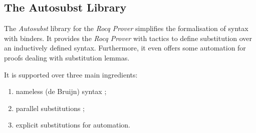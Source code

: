 \begin{comment}
Having an explicit notation for substitution, we can define the $\beta$-reduction step as 
\[ (\lambda . M) N \to_\beta M[N \cdot id]. \]

This is almost what we want. 
In most cases, we want to calculate our term $M[N \cdot id]$ modulo explicit substitutions, recovering the expected result for the substitution. We want to describe reduction rules for substitutions.
	
\begin{definition}[Rewriting rules for substitutions]
	\begin{align*}
		& 0[id] = 0 \qquad
		& id \circ s = s \\
		& 0[M \cdot \sigma] = M \qquad
		& \uparrow \circ \ id = \ \uparrow \\
		& (M N)[\sigma] = (M[\sigma])(N[\sigma]) \qquad
		& \uparrow \circ \ (M \cdot \sigma) = \sigma \\
		& (\lambda . M)[\sigma] = \lambda . (M[0 \cdot (\sigma \ \circ \uparrow)]) \qquad
		& (M \cdot \sigma) \circ \tau = M[\tau] \cdot (\sigma \circ \tau) \\
		& M[\sigma \circ \tau] = M[\sigma][\tau] \qquad
		& (\sigma_1 \circ \sigma_2) \circ \sigma_3 = \sigma_1 \circ (\sigma_2 \circ \sigma_3)
	\end{align*}
\end{definition}

In \cite{Abadi}, it is proved that these rules provide a complete rewriting system to eliminate terms of the form $M[\sigma]$.
\end{comment}

\subsection{The Autosubst Library}
\cite{AutosubstSchafer}

The \textit{Autosubst} library for the \textit{Rocq Prover} simplifies the formalisation of syntax with binders.
It provides the \textit{Rocq Prover} with tactics to define substitution over an inductively defined syntax.
Furthermore, it even offers some automation for proofs dealing with substitution lemmas.

It is supported over three main ingredients:
\begin{enumerate}
\item nameless (de Bruijn) syntax ;
\item parallel substitutions ;
\item explicit substitutions for automation.
\end{enumerate}

